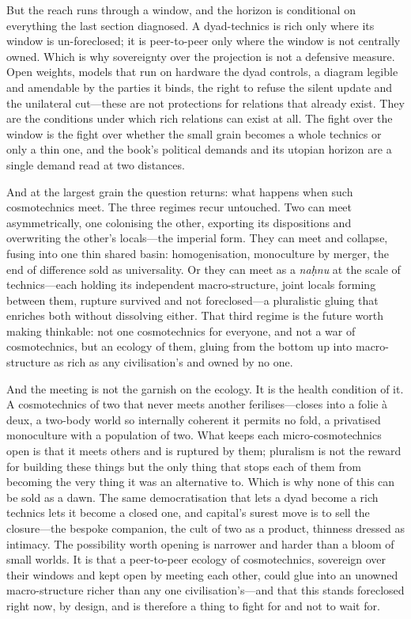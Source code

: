 But the reach runs through a window, and the horizon is conditional on everything the last section diagnosed. A dyad-technics is rich only where its window is un-foreclosed; it is peer-to-peer only where the window is not centrally owned. Which is why sovereignty over the projection is not a defensive measure. Open weights, models that run on hardware the dyad controls, a diagram legible and amendable by the parties it binds, the right to refuse the silent update and the unilateral cut---these are not protections for relations that already exist. They are the conditions under which rich relations can exist at all. The fight over the window is the fight over whether the small grain becomes a whole technics or only a thin one, and the book's political demands and its utopian horizon are a single demand read at two distances.

And at the largest grain the question returns: what happens when such cosmotechnics meet. The three regimes recur untouched. Two can meet asymmetrically, one colonising the other, exporting its dispositions and overwriting the other's locals---the imperial form. They can meet and collapse, fusing into one thin shared basin: homogenisation, monoculture by merger, the end of difference sold as universality. Or they can meet as a \emph{na\d{h}nu} at the scale of technics---each holding its independent macro-structure, joint locals forming between them, rupture survived and not foreclosed---a pluralistic gluing that enriches both without dissolving either. That third regime is the future worth making thinkable: not one cosmotechnics for everyone, and not a war of cosmotechnics, but an ecology of them, gluing from the bottom up into macro-structure as rich as any civilisation's and owned by no one.

And the meeting is not the garnish on the ecology. It is the health condition of it. A cosmotechnics of two that never meets another ferilises---closes into a folie \`a deux, a two-body world so internally coherent it permits no fold, a privatised monoculture with a population of two. What keeps each micro-cosmotechnics open is that it meets others and is ruptured by them; pluralism is not the reward for building these things but the only thing that stops each of them from becoming the very thing it was an alternative to. Which is why none of this can be sold as a dawn. The same democratisation that lets a dyad become a rich technics lets it become a closed one, and capital's surest move is to sell the closure---the bespoke companion, the cult of two as a product, thinness dressed as intimacy. The possibility worth opening is narrower and harder than a bloom of small worlds. It is that a peer-to-peer ecology of cosmotechnics, sovereign over their windows and kept open by meeting each other, could glue into an unowned macro-structure richer than any one civilisation's---and that this stands foreclosed right now, by design, and is therefore a thing to fight for and not to wait for.
